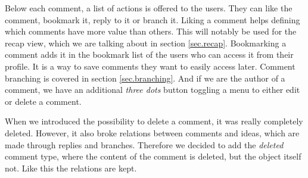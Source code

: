 \documentclass[a4paper,12pt, oneside]{article}
\begin{document}
Below each comment, a list of actions is offered to the users.
They can like the comment, bookmark it, reply to it or branch it.
Liking a comment helps defining which comments have more value than others.
This will notably be used for the recap view, which we are talking about in section \ref{sec.recap}.
Bookmarking a comment adds it in the bookmark list of the users who can access it from their profile.
It is a way to save comments they want to easily access later.
Comment branching is covered in section \ref{sec.branching}.
And if we are the author of a comment, we have an additional \emph{three dots} button toggling a menu to either edit or delete a comment.

When we introduced the possibility to delete a comment, it was really completely deleted.
However, it also broke relations between comments and ideas, which are made through replies and branches.
Therefore we decided to add the \emph{deleted} comment type, where the content of the comment is deleted, but the object itself not.
Like this the relations are kept.
\end{document}
